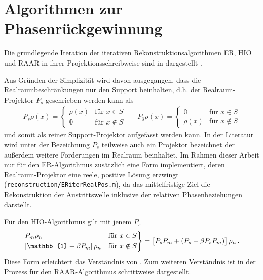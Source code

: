 \chapter{Algorithmen zur Phasenrückgewinnung}
\label{chap:anhang_algos}
Die grundlegende Iteration der iterativen Rekonstruktionsalgorithmen ER, HIO und RAAR in ihrer Projektionsschreibweise sind in  dargestellt \cite{fienup1978,luke2004,marchesini2007}.

Aus Gründen der Simplizität wird davon ausgegangen, dass die Realraumbeschränkungen nur den Support beinhalten, d.h. der Realraum-Projektor $P_s$ geschrieben werden kann als 
\begin{align}
	P_s\rho (x)=\begin{cases}
	\rho (x)  &\text{für } x\in S\\
	\mathbb{0}  &\text{für }x\notin S
	\end{cases} &   &   
	P_{\bar{s}}\rho (x)=\begin{cases}
	\mathbb{0} &\text{für } x\in S\\
	\rho (x)   &\text{für }x\notin S
	\end{cases}
\end{align}
und somit als reiner Support-Projektor aufgefasst werden kann. In der Literatur wird unter der Bezeichnung $P_s$ teilweise auch ein Projektor bezeichnet der außerdem weitere Forderungen im Realraum beinhaltet. Im Rahmen dieser Arbeit nur für den ER-Algorithmus zusätzlich eine Form implementiert, deren Realraum-Projektor eine reele, positive Lösung erzwingt (\texttt{reconstruction/ERiterRealPos.m}), da das mittelfristige Ziel die Rekonstruktion der Austrittswelle inklusive der relativen Phasenbeziehungen darstellt.
 
Für den HIO-Algorithmus gilt mit jenem $P_s$ 
\begin{align*}
	\begin{rcases}	
	P_m\rho_n                               & \text{für } x\in S    \\
	\left[\mathbb{1}-\beta P_m\right]\rho_n & \text{für } x\notin S 
	\end{rcases}	
	=\left[P_sP_m+\left(P_{\bar{s}}-\beta P_{\bar{s}} P_m\right)\right]\rho_n
	\,.
\end{align*}
Diese Form erleichtert das Verständnis von . Zum weiteren Verständnis ist in  der Prozess für den RAAR-Algorithmus schrittweise dargestellt.
	
